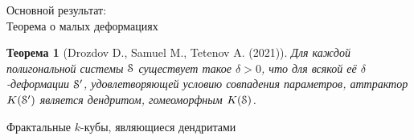 \documentclass[aspectratio=1610, 10pt, notheorems]{beamer}
\newtheorem{theorem}     {Теорема}
\newtheorem{definition}  {Определение}
\begin{document}





\begin{frame}{Основной результат:\\Теорема о малых деформациях}
\begin{theorem}[Drozdov D., Samuel M., Tetenov A. (2021)]
Для каждой полигональной системы ${\EuScript S}$ существует такое $\delta > 0$, что для всякой её $\delta$-деформации ${\EuScript S}'$, удовлетворяющей условию совпадения параметров, аттрактор $K({\EuScript S}')$ является дендритом, гомеоморфным $K({\EuScript S})$.
\end{theorem}
\end{frame}


\begin{frame}{}
\Huge{Фрактальные $k$-кубы, являющиеся дендритами}
\end{frame}
\end{document}
